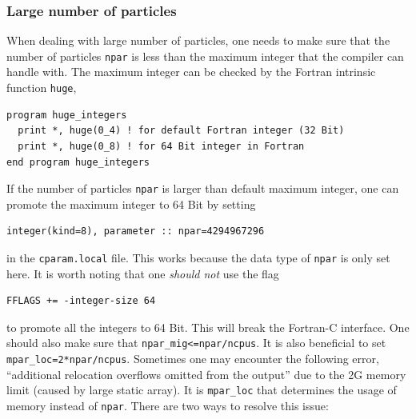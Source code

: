 \documentclass[\mydriver,12pt,twoside,notitlepage,a4paper]{article}
\newcommand{\code}[1]{\texttt{#1}}
\begin{document}
\subsubsection{Large number of particles}

When dealing with large number of particles, one needs to make sure that the
number of particles \code{npar} is less than the maximum integer that the
compiler can handle with. The maximum integer can be checked by the Fortran
intrinsic function \code{huge},
\begin{verbatim}
program huge_integers
  print *, huge(0_4) ! for default Fortran integer (32 Bit) 
  print *, huge(0_8) ! for 64 Bit integer in Fortran
end program huge_integers
\end{verbatim}
If the number of particles \code{npar} is larger than default maximum integer,
one can promote the maximum integer to 64 Bit by setting
\begin{verbatim}
integer(kind=8), parameter :: npar=4294967296
\end{verbatim}
in the \code{cparam.local} file. This works because the data type of \code{npar}
is only set here. It is worth noting that one \textit{should not} use the flag
\begin{verbatim}
FFLAGS += -integer-size 64
\end{verbatim}
to promote all the integers to 64 Bit. This will break the Fortran-C interface.
One should also make sure that \code{npar_mig<=npar/ncpus}. It is also beneficial
to set \code{mpar_loc=2*npar/ncpus}.
Sometimes one may encounter the following error,
``additional relocation overflows omitted from the output''
due to the 2G memory limit (caused by large static array).
It is \code{mpar_loc} that determines the usage of memory
instead of \code{npar}. There are two ways to resolve this issue:
\end{document}
